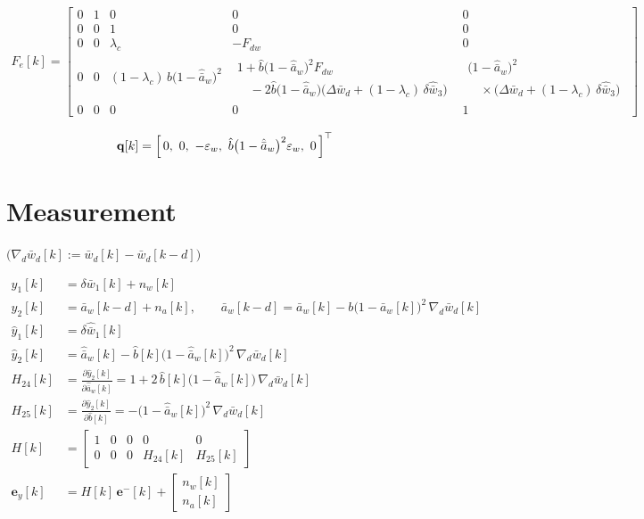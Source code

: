 \documentclass[11pt,a4paper,fontset=none]{ctexart}
\newcommand{\ba}{\bar{a}}
\newcommand{\bw}{\bar{w}}
\newcommand{\ah}{\hat{\ba}_w}
\newcommand{\bh}{\hat{b}}
\begin{document}
\begin{align*}
F_e[k] = \begin{bmatrix}
0 & 1 & 0 & 0 & 0 \\[2pt]
0 & 0 & 1 & 0 & 0 \\[2pt]
0 & 0 & \lambda_c & -F_{dw} & 0 \\[2pt]
0 & 0 & (1-\lambda_c)\,\bh\bigl(1-\ah\bigr)^{2} &
  \begin{array}{l} 1 + \bh\bigl(1-\ah\bigr)^{2}F_{dw} \\[2pt] \quad - 2\bh\bigl(1-\ah\bigr)\bigl(\Delta\bw_d + (1-\lambda_c)\,\delta\hat{\bw}_3\bigr) \end{array} &
  \begin{array}{l} \bigl(1-\ah\bigr)^{2} \\[2pt] \quad \times\bigl(\Delta\bw_d + (1-\lambda_c)\,\delta\hat{\bw}_3\bigr) \end{array} \\[14pt]
0 & 0 & 0 & 0 & 1
\end{bmatrix}
\end{align*}

\begin{align*}
\mathbf{q}[k] &= \Bigl[\,0,\ 0,\ -\varepsilon_w,\ \bh\bigl(1-\ah\bigr)^{2}\varepsilon_w,\ 0\,\Bigr]^{\top}
\end{align*}


\section{Measurement}

$\bigl(\nabla_d\bw_d[k] := \bw_d[k] - \bw_d[k-d]\bigr)$

\begin{align*}
y_1[k]     &= \delta\bw_1[k] + n_w[k] \\
y_2[k]     &= \ba_w[k-d] + n_a[k], \qquad
\ba_w[k-d]  = \ba_w[k] - b\bigl(1-\ba_w[k]\bigr)^{2}\,\nabla_d\bw_d[k] \\
\hat y_1[k] &= \delta\hat{\bw}_1[k] \\
\hat y_2[k] &= \ah[k] - \bh[k]\bigl(1-\ah[k]\bigr)^{2}\,\nabla_d\bw_d[k] \\
H_{24}[k]  &= \frac{\partial \hat y_2[k]}{\partial \ah[k]} = 1 + 2\,\bh[k]\bigl(1-\ah[k]\bigr)\,\nabla_d\bw_d[k] \\
H_{25}[k]  &= \frac{\partial \hat y_2[k]}{\partial \bh[k]} = -\bigl(1-\ah[k]\bigr)^{2}\,\nabla_d\bw_d[k] \\
H[k]       &= \begin{bmatrix} 1 & 0 & 0 & 0 & 0 \\ 0 & 0 & 0 & H_{24}[k] & H_{25}[k] \end{bmatrix} \\
\mathbf{e}_y[k] &= H[k]\,\mathbf{e}^{-}[k] + \begin{bmatrix} n_w[k] \\ n_a[k] \end{bmatrix}
\end{align*}
\end{document}
